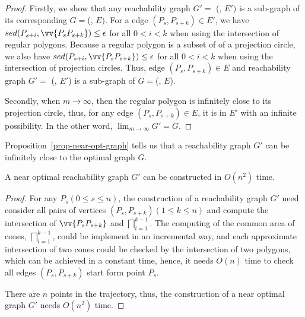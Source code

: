 \begin{proof}
	Firstly, we show that any reachability graph $G'=$ (, $E')$ is a sub-graph of its corresponding $G=$(, $E)$.
	For a edge $(P_s, P_{s+k}) \in E'$, we have $sed(P_{s+i}, \vv{P_sP_{s+k}}) \le \epsilon$ for all $0<i<k$ when using the intersection of regular polygons. 
	Because a regular polygon is a subset of of a projection circle, we also have $sed(P_{s+i}, \vv{P_sP_{s+k}}) \le \epsilon$ for all $0<i<k$ when using the intersection of projection circles.
	Thus, edge $(P_s, P_{s+k}) \in E$ and reachability graph $G'=$ (, $E'$) is a sub-graph of $G=$(, $E$).
	
	Secondly, when $m \to \infty$, then the regular polygon is infinitely close to its projection circle, thus, for any edge $(P_s, P_{s+k}) \in E$, it is in $E'$ with an infinite possibility. In the other word, $\lim_{m \to \infty}{G'=G}$.
\end{proof}

Proposition~\ref{prop-near-opt-graph} tells us that a reachability graph $G'$ can be infinitely close to the optimal graph $G$.

\begin{prop}
	\label{prop-near-opt-graph-construction}
	A near optimal reachability graph $G'$ can be constructed in $O(n^2)$ time.
\end{prop}

\begin{proof}
For any $P_s (0\le s \le n)$, the construction of a reachability graph $G'$ need consider all pairs of vertices $(P_s,P_{s+k}) (1\le k \le n)$ and compute the intersection of $\vv{P_sP_{s+k}}$ and $\bigsqcap_{i=1}^{k - 1}$. 
The computing of the common area of cones, \ie $\bigsqcap_{i=1}^{k - 1}$, could be implement in an incremental way, and each approximate intersection of two cones could be checked by the intersection of two polygons, which can be achieved in a constant time, hence, it needs $O(n)$ time to check all edges $(P_s,P_{s+k})$ start form point $P_s$. 

There are $n$ points in the trajectory, thus, the construction of a near optimal graph $G'$ needs $O(n^2)$ time.
\end{proof}


